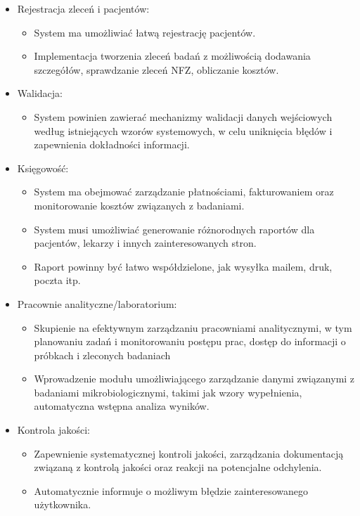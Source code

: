 \documentclass[12pt,a4paper]{article}
\begin{document}
\begin{itemize}

\item Rejestracja zleceń i pacjentów:
      \begin{itemize}
      \item System ma umożliwiać łatwą rejestrację pacjentów.
      \item Implementacja tworzenia zleceń badań z możliwością dodawania szczegółów, sprawdzanie zleceń NFZ, obliczanie kosztów.
      \end{itemize}
      
\item Walidacja:
    \begin{itemize}
    \item System powinien zawierać mechanizmy walidacji danych wejściowych według istniejących wzorów systemowych, w celu uniknięcia błędów i zapewnienia dokładności informacji.
    \end{itemize}
    
\item Księgowość:
    \begin{itemize}
    \item System ma obejmować zarządzanie płatnościami, fakturowaniem oraz monitorowanie kosztów związanych z badaniami.
    \item System musi umożliwiać generowanie różnorodnych raportów dla pacjentów, lekarzy i innych zainteresowanych stron.
    \item Raport powinny być łatwo współdzielone, jak wysyłka mailem, druk, poczta itp.
    \end{itemize}

\item Pracownie analityczne/laboratorium:
    \begin{itemize}
    \item Skupienie na efektywnym zarządzaniu pracowniami analitycznymi, w tym planowaniu zadań i monitorowaniu postępu prac, dostęp do informacji o próbkach i zleconych badaniach
    \item Wprowadzenie modułu umożliwiającego zarządzanie danymi związanymi z badaniami mikrobiologicznymi, takimi jak wzory wypełnienia, automatyczna wstępna analiza wyników.
    \end{itemize}

\item  Kontrola jakości:
    \begin{itemize}
    \item Zapewnienie systematycznej kontroli jakości, zarządzania dokumentacją związaną z kontrolą jakości oraz reakcji na potencjalne odchylenia.
    \item Automatycznie informuje o możliwym błędzie zainteresowanego użytkownika.
    \end{itemize}


\end{itemize}
\end{document}
